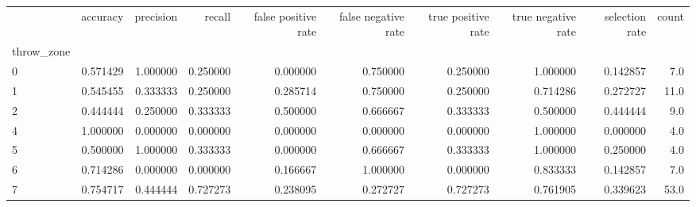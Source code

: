\begin{tabular}{lrrrrrrrrr}
\toprule
{} &  accuracy &  precision &    recall &  false positive rate &  false negative rate &  true positive rate &  true negative rate &  selection rate &  count \\
throw\_zone &           &            &           &                      &                      &                     &                     &                 &        \\
\midrule
0          &  0.571429 &   1.000000 &  0.250000 &             0.000000 &             0.750000 &            0.250000 &            1.000000 &        0.142857 &    7.0 \\
1          &  0.545455 &   0.333333 &  0.250000 &             0.285714 &             0.750000 &            0.250000 &            0.714286 &        0.272727 &   11.0 \\
2          &  0.444444 &   0.250000 &  0.333333 &             0.500000 &             0.666667 &            0.333333 &            0.500000 &        0.444444 &    9.0 \\
4          &  1.000000 &   0.000000 &  0.000000 &             0.000000 &             0.000000 &            0.000000 &            1.000000 &        0.000000 &    4.0 \\
5          &  0.500000 &   1.000000 &  0.333333 &             0.000000 &             0.666667 &            0.333333 &            1.000000 &        0.250000 &    4.0 \\
6          &  0.714286 &   0.000000 &  0.000000 &             0.166667 &             1.000000 &            0.000000 &            0.833333 &        0.142857 &    7.0 \\
7          &  0.754717 &   0.444444 &  0.727273 &             0.238095 &             0.272727 &            0.727273 &            0.761905 &        0.339623 &   53.0 \\
\bottomrule
\end{tabular}
